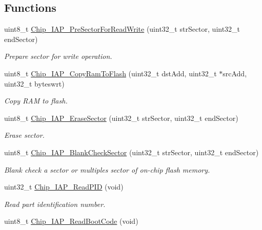 \subsection*{Functions}
\begin{DoxyCompactItemize}
\item 
uint8\+\_\+t \hyperlink{group___c_o_m_m_o_n___i_a_p_gac45b60745e55670c7fa806e2865625c4}{Chip\+\_\+\+I\+A\+P\+\_\+\+Pre\+Sector\+For\+Read\+Write} (uint32\+\_\+t str\+Sector, uint32\+\_\+t end\+Sector)
\begin{DoxyCompactList}\small\item\em Prepare sector for write operation. \end{DoxyCompactList}\item 
uint8\+\_\+t \hyperlink{group___c_o_m_m_o_n___i_a_p_ga71cb8cde86dc344b05219cdf1ecee638}{Chip\+\_\+\+I\+A\+P\+\_\+\+Copy\+Ram\+To\+Flash} (uint32\+\_\+t dst\+Add, uint32\+\_\+t $\ast$src\+Add, uint32\+\_\+t byteswrt)
\begin{DoxyCompactList}\small\item\em Copy R\+A\+M to flash. \end{DoxyCompactList}\item 
uint8\+\_\+t \hyperlink{group___c_o_m_m_o_n___i_a_p_ga02dbb90a49e24dc449d45a66f03a4a2d}{Chip\+\_\+\+I\+A\+P\+\_\+\+Erase\+Sector} (uint32\+\_\+t str\+Sector, uint32\+\_\+t end\+Sector)
\begin{DoxyCompactList}\small\item\em Erase sector. \end{DoxyCompactList}\item 
uint8\+\_\+t \hyperlink{group___c_o_m_m_o_n___i_a_p_ga98c7e657a618cf004a8967112dae1a30}{Chip\+\_\+\+I\+A\+P\+\_\+\+Blank\+Check\+Sector} (uint32\+\_\+t str\+Sector, uint32\+\_\+t end\+Sector)
\begin{DoxyCompactList}\small\item\em Blank check a sector or multiples sector of on-\/chip flash memory. \end{DoxyCompactList}\item 
uint32\+\_\+t \hyperlink{group___c_o_m_m_o_n___i_a_p_gaa4b90551649db0627dc195acfc834cbe}{Chip\+\_\+\+I\+A\+P\+\_\+\+Read\+P\+I\+D} (void)
\begin{DoxyCompactList}\small\item\em Read part identification number. \end{DoxyCompactList}\item 
uint8\+\_\+t \hyperlink{group___c_o_m_m_o_n___i_a_p_ga478acfa6d97211d4f43edfa8717dc066}{Chip\+\_\+\+I\+A\+P\+\_\+\+Read\+Boot\+Code} (void)

\end{DoxyCompactItemize}
